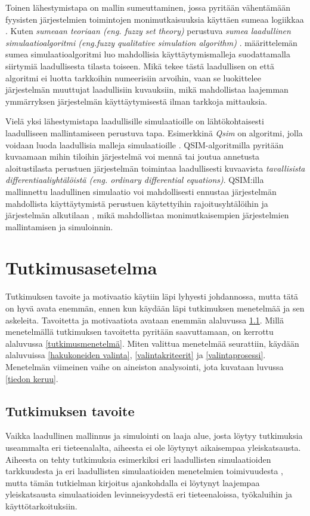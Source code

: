 \documentclass[utf8]{gradu3}
\begin{document}
Toinen lähestymistapa on mallin sumeuttaminen, 
jossa pyritään vähentämään fyysisten järjestelmien toimintojen 
monimutkaisuuksia käyttäen sumeaa logiikkaa \parencite{shen1993fuzzy}.
Kuten \textit{sumeaan teoriaan (eng. fuzzy set theory)} 
perustuva \textit{sumea laadullinen simulaatioalgoritmi 
(eng.fuzzy qualitative simulation algorithm)} \parencite{shen1993fuzzy}.
\textcite{shen1993fuzzy} määrittelemän sumea simulaatioalgoritmi 
luo mahdollisia käyttäytymismalleja suodattamalla siirtymiä laadullisesta tilasta
toiseen. Mikä tekee tästä laadullisen on 
että algoritmi ei luotta tarkkoihin numeerisiin arvoihin, 
vaan se luokittelee järjestelmän muuttujat laadullisiin kuvauksiin, 
mikä mahdollistaa laajemman ymmärryksen järjestelmän käyttäytymisestä 
ilman tarkkoja mittauksia.

Vielä yksi lähestymistapa laadullisille simulaatioille on lähtökohtaisesti 
laadulliseen mallintamiseen perustuva tapa.
Esimerkkinä \textit{Qsim} on algoritmi, 
jolla voidaan luoda laadullisia malleja simulaatioille
\parencite{kuipers1986qualitative}. 
QSIM-algoritmilla pyritään kuvaamaan mihin tiloihin
järjestelmä voi mennä tai joutua annetusta aloitustilasta 
perustuen järjestelmän toimintaa laadullisesti kuvaavista 
\textit{ tavallisista differentiaaliyhtälöistä 
(eng. ordinary differential equations)}.
QSIM:illa mallinnettu laadullinen simulaatio voi mahdollisesti ennustaa 
järjestelmän mahdollista käyttäytymistä perustuen käytettyihin rajoitusyhtälöihin 
ja järjestelmän alkutilaan \parencite{kuipers1986qualitative}, mikä mahdollistaa
monimutkaisempien järjestelmien mallintamisen ja simuloinnin.




\chapter{Tutkimusasetelma}
Tutkimuksen tavoite ja motivaatio käytiin läpi lyhyesti johdannossa, mutta 
tätä on hyvä avata enemmän, ennen kun käydään läpi tutkimuksen menetelmää ja 
sen askeleita. Tavoitetta ja motivaatiota avataan enemmän alaluvussa \ref{tavoite}.
Millä menetelmällä tutkimuksen tavoitetta pyritään saavuttamaan, on kerrottu alaluvussa 
\ref{tutkimusmenetelmä}. 
Miten valittua menetelmää seurattiin, käydään alaluvuissa 
\ref{hakukoneiden valinta}, \ref{valintakriteerit} ja \ref{valintaprosessi}.
Menetelmän viimeinen vaihe on aineiston analysointi, jota kuvataan luvussa
\ref{tiedon keruu}.

 \section{Tutkimuksen tavoite} \label{tavoite}
Vaikka laadullinen mallinnus ja simulointi on laaja alue, 
josta löytyy tutkimuksia useammalta eri tieteenalalta, 
aiheesta ei ole löytynyt aikaisempaa yleiskatsausta. 
Aiheesta on tehty tutkimuksia esimerkiksi 
eri laadullisten simulaatioiden tarkkuudesta \parencite{FisherManagmentTechniques2024} 
ja eri laadullisten simulaatioiden menetelmien toimivuudesta
\parencite{qualitativeSimTechniquesAssesment1992}, 
mutta tämän tutkielman kirjoitus ajankohdalla ei löytynyt laajempaa yleiskatsausta 
simulaatioiden levinneisyydestä eri tieteenaloissa, työkaluihin ja käyttötarkoituksiin.  
\end{document}
